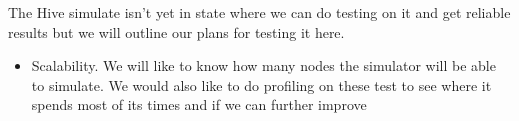 
The Hive simulate isn't yet in state where we can do testing on
it and get reliable results but we will outline our plans for 
testing it here.

\begin{itemize}
	\item Scalability. We will like to know how many nodes
	the simulator will be able to simulate. We would also
	like to do profiling on these test to see where it
	spends most of its times and if we can further improve
\end{itemize}
